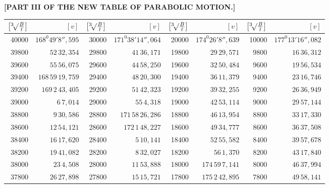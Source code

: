 \clearpage
{}
\begingroup
\centering
\fontsize{9}{9}\selectfont
\setlength{\tabcolsep}{.75pt}
\renewcommand{\arraystretch}{.9}
\setlength{\parskip}{0pt}
\textbf{[PART III OF THE NEW TABLE OF PARABOLIC MOTION.]}
\par\vspace{7pt}
\begin{tabular}{|r|r||r|r||r|r||r|r|}
\hline
\rule[-6pt]{0pt}{20pt}\(\bigl[\BareRoot[3]{\frac{B}{t}}\bigr]\) & \([v]\) & \(\bigl[\BareRoot[3]{\frac{B}{t}}\bigr]\) & \([v]\) & \(\bigl[\BareRoot[3]{\frac{B}{t}}\bigr]\) & \([v]\) & \(\bigl[\BareRoot[3]{\frac{B}{t}}\bigr]\) & \([v]\) \\
\hline
40000 & \(168^{0}49'8'',\!595\) & 30000 & \(171^{0}38'14'',\!064\) & 20000 & \(174^{0}26'8'',\!639\) & 10000 & \(177^{0}13'16'',\!082\) \\[1pt]
39800 & \(52\,32,\!354\) & 29800 & \(41\,36,\!171\) & 19800 & \(29\,29,\!571\) & 9800 & \(16\,36,\!312\) \\
39600 & \(55\,56,\!075\) & 29600 & \(44\,58,\!250\) & 19600 & \(32\,50,\!484\) & 9600 & \(19\,56,\!534\) \\
39400 & \(168\,59\,19,\!759\) & 29400 & \(48\,20,\!300\) & 19400 & \(36\,11,\!379\) & 9400 & \(23\,16,\!746\) \\
39200 & \(169\,2\,43,\!405\) & 29200 & \(51\,42,\!323\) & 19200 & \(39\,32,\!255\) & 9200 & \(26\,36,\!949\) \\
39000 & \(6\,7,\!014\) & 29000 & \(55\,4,\!318\) & 19000 & \(42\,53,\!114\) & 9000 & \(29\,57,\!144\) \\[1pt]
38800 & \(9\,30,\!586\) & 28800 & \(171\,58\,26,\!286\) & 18800 & \(46\,13,\!954\) & 8800 & \(33\,17,\!330\) \\
38600 & \(12\,54,\!121\) & 28600 & \(172\,1\,48,\!227\) & 18600 & \(49\,34,\!777\) & 8600 & \(36\,37,\!508\) \\
38400 & \(16\,17,\!620\) & 28400 & \(5\,10,\!141\) & 18400 & \(52\,55,\!582\) & 8400 & \(39\,57,\!678\) \\
38200 & \(19\,41,\!082\) & 28200 & \(8\,32,\!027\) & 18200 & \(56\,1,\!370\) & 8200 & \(43\,17,\!840\) \\
38000 & \(23\,4,\!508\) & 28000 & \(11\,53,\!888\) & 18000 & \(174\,59\,7,\!141\) & 8000 & \(46\,37,\!994\) \\[1pt]
37800 & \(26\,27,\!898\) & 27800 & \(15\,15,\!721\) & 17800 & \(175\,2\,42,\!895\) & 7800 & \(49\,58,\!141\) \\

\end{tabular}
